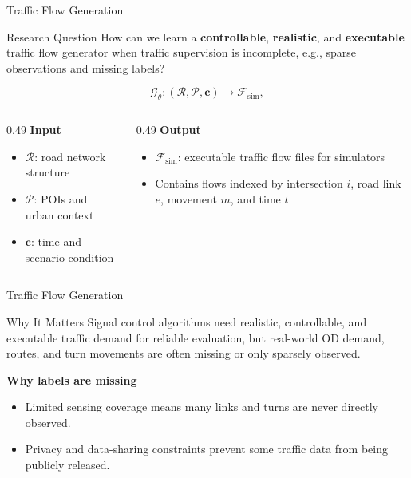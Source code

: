 \documentclass[aspectratio=169,11pt]{beamer}
\begin{document}
\begin{frame}[t]{Traffic Flow Generation}
  \footnotesize
  \begin{block}{Research Question}
    How can we learn a \textbf{controllable}, \textbf{realistic}, and \textbf{executable} traffic flow generator when traffic supervision is incomplete, e.g., sparse observations and missing labels?
  \end{block}

  \vspace{0.18cm}
  \centering
  \[
    \mathcal{G}_{\theta}:
    (\mathcal{R}, \mathcal{P}, \mathbf{c})
    \rightarrow
    \mathcal{F}_{\mathrm{sim}},
  \]
  \vspace{-0.1cm}
  \begin{columns}[T,onlytextwidth]
    \begin{column}{0.49\textwidth}
      \textbf{Input}
      \begin{itemize}
        \item $\mathcal{R}$: road network structure
        \item $\mathcal{P}$: POIs and urban context
        \item $\mathbf{c}$: time and scenario condition
      \end{itemize}
    \end{column}

    \begin{column}{0.49\textwidth}
      \textbf{Output}
      \begin{itemize}
        \item $\mathcal{F}_{\mathrm{sim}}$: executable traffic flow files for simulators
        \item Contains flows indexed by intersection $i$, road link $e$, movement $m$, and time $t$
      \end{itemize}
    \end{column}
  \end{columns}
\end{frame}

\begin{frame}[t]{Traffic Flow Generation}
  \footnotesize
  \begin{block}{Why It Matters}
    Signal control algorithms need realistic, controllable, and executable traffic demand
    for reliable evaluation, but real-world OD demand, routes, and turn movements are often
    missing or only sparsely observed.
  \end{block}

  \vspace{0.35cm}
  \textbf{Why labels are missing}
  \begin{itemize}
    \item Limited sensing coverage means many links and turns are never directly observed.
    \item Privacy and data-sharing constraints prevent some traffic data from being publicly released.
  \end{itemize}
\end{frame}
\end{document}
